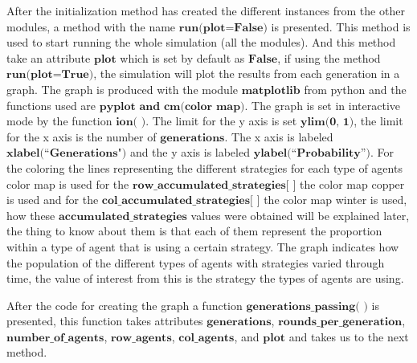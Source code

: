 \documentclass{book}
\begin{document}
After the initialization method has created the different instances from the other modules, a method with the name $\textbf{run(plot=False)}$ is presented. This method is used to start running the whole simulation (all the modules). And this method take an attribute $\textbf{plot}$ which is set by default as $\textbf{False}$, if using the method $\textbf{run(plot=True)}$, the simulation will plot the results from each generation in a graph. The graph is produced with the module $\textbf{matplotlib}$ from python and the functions used are $\textbf{pyplot and cm(color map)}$. The graph is set in interactive mode by the function $\textbf{ion( )}$. The limit for the y axis is set $\textbf{ylim(0, 1)}$, the limit for the x axis is the number of $\textbf{generations}$. The x axis is labeled $\textbf{xlabel(``Generations")}$ and the y axis is labeled $\textbf{ylabel(``Probability'')}$. For the coloring the lines representing the different strategies for each type of agents color map is used for the $\textbf{row\_accumulated\_strategies[ ]}$ the color map copper is used and for the $\textbf{col\_accumulated\_strategies[ ]}$ the color map winter is used, how these $\textbf{accumulated\_strategies}$ values were obtained will be explained later, the thing to know about them is that each of them represent the proportion within a type of agent that is using a certain strategy. The graph indicates how the population of the different types of agents with strategies varied through time, the value of interest from this is the strategy the types of agents are using.

After the code for creating the graph a function $\textbf{generations\_passing( )}$ is presented, this function takes attributes $\textbf{generations}$, $\textbf{rounds\_per\_generation}$, $\textbf{number\_of\_agents}$, $\textbf{row\_agents}$, $\textbf{col\_agents}$, and $\textbf{plot}$ and takes us to the next method.
\end{document}
